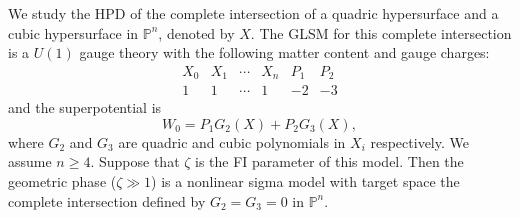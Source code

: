 \documentclass[a4paper,11pt]{article}
\numberwithin{equation}{section}
\begin{document}
We study the HPD of the complete intersection of a quadric hypersurface and a 
cubic hypersurface in $\mathbb{P}^n$, denoted by $X$. The GLSM for this 
complete intersection is a $U(1)$ gauge theory with the following matter content 
and gauge charges:
\[
\begin{array}{cccccc}
X_0 & X_1 & \cdots & X_n & P_1 & P_2 \\
1 & 1 & \cdots & 1 & -2 & -3
\end{array}
\]
and the superpotential is
\begin{equation}\label{WP23}
W_0 = P_1 G_2(X) + P_2 G_3(X),
\end{equation}
where $G_2$ and $G_3$ are quadric and cubic polynomials in $X_i$ respectively. We assume $n \geq 4$. Suppose that $\zeta$ is the FI parameter of this model. Then the geometric phase ($\zeta \gg 1$) is a nonlinear sigma model with target space the complete intersection defined by $G_2=G_3=0$ in $\mathbb{P}^n$. 
\end{document}
